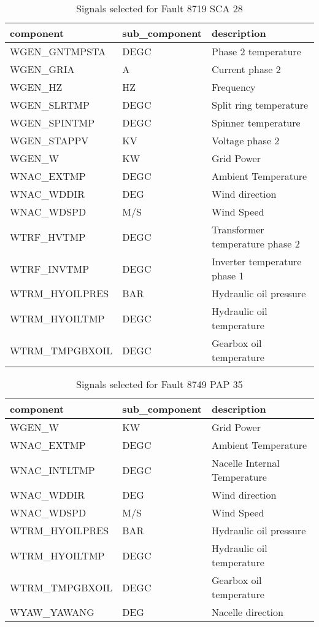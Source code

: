\begin{table}[h!t]
    \centering
    \begin{tabular}{|l|l|l|}
    \hline
        component & sub\_component & description \\ \hline
        WGEN\_GNTMPSTA & DEGC & Phase 2 temperature \\ \hline
        WGEN\_GRIA & A & Current phase 2 \\ \hline
        WGEN\_HZ & HZ & Frequency \\ \hline
        WGEN\_SLRTMP & DEGC & Split ring temperature \\ \hline
        WGEN\_SPINTMP & DEGC & Spinner temperature \\ \hline
        WGEN\_STAPPV & KV & Voltage phase 2 \\ \hline
        WGEN\_W & KW & Grid Power \\ \hline
        WNAC\_EXTMP & DEGC & Ambient Temperature \\ \hline
        WNAC\_WDDIR & DEG & Wind direction \\ \hline
        WNAC\_WDSPD & M/S & Wind Speed \\ \hline
        WTRF\_HVTMP & DEGC & Transformer temperature phase 2 \\ \hline
        WTRF\_INVTMP & DEGC & Inverter temperature phase 1 \\ \hline
        WTRM\_HYOILPRES & BAR & Hydraulic oil pressure \\ \hline
        WTRM\_HYOILTMP & DEGC & Hydraulic oil temperature \\ \hline
        WTRM\_TMPGBXOIL & DEGC & Gearbox oil temperature \\ \hline
    \end{tabular}
    \caption{Signals selected for Fault 8719 SCA 28}
\end{table}

\begin{table}[h!t]
    \centering
    \begin{tabular}{|l|l|l|}
    \hline
        component & sub\_component & description \\ \hline
        WGEN\_W & KW & Grid Power \\ \hline
        WNAC\_EXTMP & DEGC & Ambient Temperature \\ \hline
        WNAC\_INTLTMP & DEGC & Nacelle Internal Temperature \\ \hline
        WNAC\_WDDIR & DEG & Wind direction \\ \hline
        WNAC\_WDSPD & M/S & Wind Speed \\ \hline
        WTRM\_HYOILPRES & BAR & Hydraulic oil pressure \\ \hline
        WTRM\_HYOILTMP & DEGC & Hydraulic oil temperature \\ \hline
        WTRM\_TMPGBXOIL & DEGC & Gearbox oil temperature \\ \hline
        WYAW\_YAWANG & DEG & Nacelle direction \\ \hline
    \end{tabular}
    \caption{Signals selected for Fault 8749 PAP 35}
\end{table}


